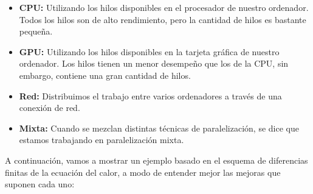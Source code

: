\begin{itemize}
\item \textbf{CPU:} Utilizando los hilos disponibles en el procesador de nuestro ordenador. Todos los hilos son de alto rendimiento, pero la cantidad de hilos es bastante pequeña.

\item \textbf{GPU:} Utilizando los hilos disponibles en la tarjeta gráfica de nuestro\\ ordenador. Los hilos tienen un menor desempeño que los de la CPU, sin embargo, contiene una gran cantidad de hilos.
  
\item \textbf{Red:} Distribuimos el trabajo entre varios ordenadores a través de una conexión de red.
  
\item \textbf{Mixta: } Cuando se mezclan distintas técnicas de paralelización, se dice que estamos trabajando en paralelización mixta.
\end{itemize}

A continuación, vamos a mostrar un ejemplo basado en el esquema de diferencias finitas de la ecuación del calor, a modo de entender mejor las mejoras que suponen cada uno:

